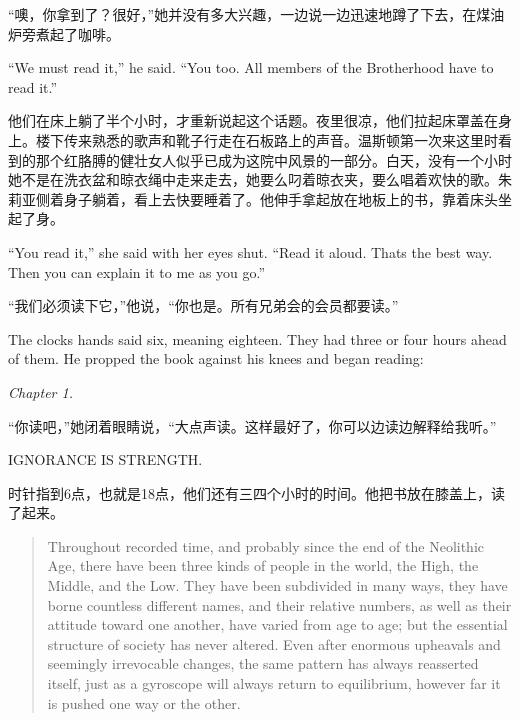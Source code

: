 \begin{paracol}{2}
\switchcolumn

``噢，你拿到了？很好，''她并没有多大兴趣，一边说一边迅速地蹲了下去，在煤油炉旁煮起了咖啡。

\switchcolumn*

``We must read it,'' he said. ``You too. All members of the Brotherhood
have to read it.''

\switchcolumn

他们在床上躺了半个小时，才重新说起这个话题。夜里很凉，他们拉起床罩盖在身上。楼下传来熟悉的歌声和靴子行走在石板路上的声音。温斯顿第一次来这里时看到的那个红胳膊的健壮女人似乎已成为这院中风景的一部分。白天，没有一个小时她不是在洗衣盆和晾衣绳中走来走去，她要么叼着晾衣夹，要么唱着欢快的歌。朱莉亚侧着身子躺着，看上去快要睡着了。他伸手拿起放在地板上的书，靠着床头坐起了身。

\switchcolumn*

``You read it,'' she said with her eyes shut. ``Read it aloud.
That\textquotesingle s the best way. Then you can explain it to me as
you go.''

\switchcolumn

``我们必须读下它，''他说，``你也是。所有兄弟会的会员都要读。''

\switchcolumn*

The clock\textquotesingle s hands said six, meaning eighteen. They had
three or four hours ahead of them. He propped the book against his knees
and began reading:
\begin{center}
\emph{Chapter 1.}

\switchcolumn

``你读吧，''她闭着眼睛说，``大点声读。这样最好了，你可以边读边解释给我听。''

\switchcolumn*

IGNORANCE IS STRENGTH.
\end{center}

\switchcolumn

时针指到6点，也就是18点，他们还有三四个小时的时间。他把书放在膝盖上，读了起来。

\switchcolumn*

\begin{quotation}
Throughout recorded time, and probably since the end of the Neolithic
Age, there have been three kinds of people in the world, the High, the
Middle, and the Low. They have been subdivided in many ways, they have
borne countless different names, and their relative numbers, as well as
their attitude toward one another, have varied from age to age; but the
essential structure of society has never altered. Even after enormous
upheavals and seemingly irrevocable changes, the same pattern has always
reasserted itself, just as a gyroscope will always return to
equilibrium, however far it is pushed one way or the other.
\end{quotation}


\end{paracol}
